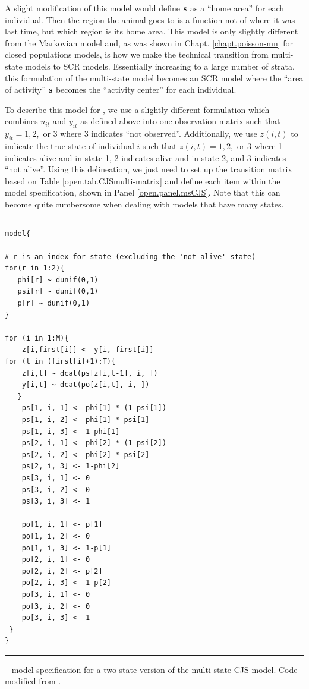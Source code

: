 A slight modification of this model would define ${\bf s}$ as a ``home
area'' for each individual. Then the region the animal goes to is a
function not of where it was last time, but which region is its home
area.  This model is only slightly different from the Markovian model
and, as was shown in Chapt. \ref{chapt.poisson-mn} for closed
populations models, is how we make the technical transition from
multi-state models to SCR models.  Essentially increasing to a large
number of strata, this formulation of the multi-state model becomes an
SCR model where the ``area of activity'' ${\bf s}$ becomes the
``activity center'' for each individual.

To describe this model for \jags, we use a slightly different
formulation which combines $u_{it}$ and $y_{it}$ as defined above into
one observation matrix such that $y_{it} = 1, 2,$ or $3$ where 3
indicates ``not observed''.  Additionally, we use $z(i,t)$ to indicate
the true state of individual $i$ such that $z(i,t) = 1, 2,$ or $3$
where 1 indicates alive and in state 1, 2 indicates alive and in state
2, and 3 indicates ``not alive''.  Using this delineation, we just
need to set up the transition matrix based on Table
\ref{open.tab.CJSmulti-matrix} and define each item within the model
specification, shown in Panel \ref{open.panel.msCJS}.  Note that this
can become quite cumbersome when dealing with models that have many
states.


\begin{panel}[htp]
\centering
\rule[0.1in]{\textwidth}{.03in}
{\small
\begin{verbatim}
model{

# r is an index for state (excluding the 'not alive' state)
for(r in 1:2){
   phi[r] ~ dunif(0,1)
   psi[r] ~ dunif(0,1)
   p[r] ~ dunif(0,1)
}    

for (i in 1:M){
    z[i,first[i]] <- y[i, first[i]]
for (t in (first[i]+1):T){
    z[i,t] ~ dcat(ps[z[i,t-1], i, ])
    y[i,t] ~ dcat(po[z[i,t], i, ])
   }
	ps[1, i, 1] <- phi[1] * (1-psi[1])
	ps[1, i, 2] <- phi[1] * psi[1]
	ps[1, i, 3] <- 1-phi[1]
	ps[2, i, 1] <- phi[2] * (1-psi[2])
	ps[2, i, 2] <- phi[2] * psi[2]
	ps[2, i, 3] <- 1-phi[2]
	ps[3, i, 1] <- 0
	ps[3, i, 2] <- 0
	ps[3, i, 3] <- 1

	po[1, i, 1] <- p[1]
	po[1, i, 2] <- 0
	po[1, i, 3] <- 1-p[1]
	po[2, i, 1] <- 0
	po[2, i, 2] <- p[2]
	po[2, i, 3] <- 1-p[2]
	po[3, i, 1] <- 0
	po[3, i, 2] <- 0
	po[3, i, 3] <- 1
 }
}
\end{verbatim}
}
\rule[-0.1in]{\textwidth}{.03in}
\caption{
\jags~ model specification for a two-state version of the multi-state
CJS model. Code modified 
from \cite[][Chapt. 9]{kery_schaub:2011}. }
\label{open.panel.msCJS}
\end{panel}

